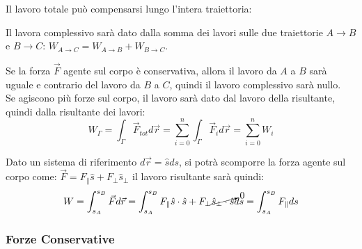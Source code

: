 \documentclass{article}
\numberwithin{equation}{subsection}
\begin{document}
Il lavoro totale può compensarsi lungo l'intera 
traiettoria:
\begin{center}\end{center}



Il lavora complessivo sarà dato dalla somma dei lavori sulle due traiettorie $A\to B$ e $B\to C$: $W_{A\to C}=W_{A\to B}+W_{B\to C}$. 


Se la forza $\vec{F}$ agente sul corpo è conservativa, allora il lavoro 
da $A$ a $B$ sarà uguale e contrario del lavoro da $B$ a $C$, 
quindi il lavoro complessivo sarà nullo.\\
Se agiscono più forze sul corpo, il lavoro sarà dato dal 
lavoro della risultante, quindi dalla risultante dei lavori:
\begin{equation}
    W_{\Gamma}=\displaystyle\int_{\Gamma}\vec{F}_{tot}d\vec{r}=\sum_{i=0}^{n}\int_{\Gamma}\vec{F}_id\vec{r}=\sum_{i=0}^{n}W_i
\end{equation}

Dato un sistema di riferimento $d\vec{r}=\hat{s}ds$, si potrà 
scomporre la forza agente sul corpo come: $\vec{F}=F_{\parallel}\hat{s}+F_{\perp}\hat{s}_{\perp}$ 
il lavoro risultante sarà quindi: 
\begin{equation}
    W=\int_{s_A}^{s_B}\vec{F}d\vec{r}=\int_{s_A}^{s_B}F_{\parallel}\hat{s}\cdot\hat{s}+F_{\perp}\cancelto{0}{\hat{s}_{\perp}\cdot\hat{s}}ds=\int_{s_A}^{s_B}F_{\parallel}ds
\end{equation}

\subsubsection{Forze Conservative}
\end{document}

